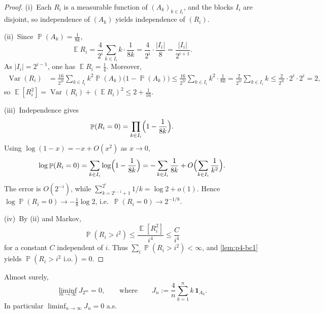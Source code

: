 \documentclass[11pt,a4paper]{article}
\DeclareMathOperator{\Var}{Var}
\DeclareMathOperator{\E}{\mathbb{E}}
\DeclareMathOperator{\Pbb}{\mathbb{P}}
\begin{document}
\begin{proof}
(i)\, Each \(R_i\) is a measurable function of \((A_k)_{k\in I_i}\), and the blocks \(I_i\) are disjoint, so independence of \((A_k)\) yields independence of \((R_i)\).

(ii)\, Since \(\Pbb(A_k)=\frac1{8k}\),
\[
\E R_i
=
\frac{4}{2^i}\sum_{k\in I_i}k\cdot\frac{1}{8k}
=
\frac{4}{2^i}\cdot\frac{\lvert I_i\rvert}{8}
=
\frac{\lvert I_i\rvert}{2^{i+1}}.
\]
As \(\lvert I_i\rvert=2^{i-1}\), one has \(\E R_i=\frac14\). Moreover,
\begin{align*}
\Var(R_i)
&=
\frac{16}{2^{2i}}\sum_{k\in I_i}k^2\Pbb(A_k)\bigl(1-\Pbb(A_k)\bigr)
\le
\frac{16}{2^{2i}}\sum_{k\in I_i}k^2\cdot\frac{1}{8k}
=
\frac{2}{2^{2i}}\sum_{k\in I_i}k
\le
\frac{2}{2^{2i}}\cdot 2^i\cdot 2^i
=
2,
\end{align*}
so \(\E[R_i^2]=\Var(R_i)+(\E R_i)^2\le 2+\tfrac1{16}\).

(iii)\, Independence gives
\[
\Pbb(R_i=0)
=
\prod_{k\in I_i}\Bigl(1-\frac{1}{8k}\Bigr).
\]
Using \(\log(1-x)=-x+O(x^2)\) as \(x\to 0\),
\[
\log\Pbb(R_i=0)
=
\sum_{k\in I_i}\log\Bigl(1-\frac{1}{8k}\Bigr)
=
-\sum_{k\in I_i}\frac{1}{8k}
+
O\Bigl(\sum_{k\in I_i}\frac{1}{k^2}\Bigr).
\]
The error is \(O(2^{-i})\), while \(\sum_{k=2^{i-1}+1}^{2^i}1/k=\log 2+o(1)\). Hence \(\log\Pbb(R_i=0)\to -\frac18\log 2\), i.e.\ \(\Pbb(R_i=0)\to 2^{-1/8}\).

(iv)\, By (ii) and Markov,
\[
\Pbb(R_i>i^2)
\le
\frac{\E[R_i^2]}{i^4}
\le
\frac{C}{i^4}
\]
for a constant \(C\) independent of \(i\). Thus \(\sum_i\Pbb(R_i>i^2)<\infty\), and \cref{lem:p4-bc1} yields \(\Pbb(R_i>i^2\text{ i.o.})=0\).
\end{proof}

\begin{lemma}
\label{lem:p4-dilute}
Almost surely,
\[
\liminf_{m\to\infty}J_{2^m}=0,
\qquad
\text{where}
\qquad
J_n
:=
\frac{4}{n}\sum_{k=1}^n k\,\mathbf{1}_{A_k}.
\]
In particular \(\liminf_{n\to\infty}J_n=0\) a.s.
\end{lemma}
\end{document}
